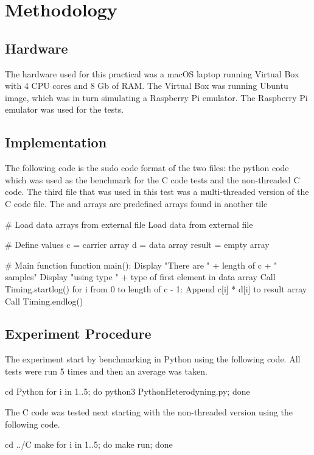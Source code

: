 \section{Methodology}

\subsection{Hardware}
The hardware used for this practical was a macOS laptop running Virtual Box with 4 CPU cores and 8 Gb of RAM. The Virtual Box was running Ubuntu image, which was in turn simulating a Raspberry Pi emulator. The Raspberry Pi emulator was used for the tests.

\subsection{Implementation}
The following code is the sudo code format of the two files: the python code which was used as the benchmark for the C code tests and the non-threaded C code.
The third file that was used in this test was a multi-threaded version of the C code file.
The  and  arrays are predefined arrays found in another tile

\begin{Cpp}
 # Load data arrays from external file
 Load data from external file

 # Define values
 c = carrier array
 d = data array
 result = empty array

 # Main function
 function main():
  Display "There are " + length of c + " samples"
  Display "using type " + type of first element in data array
  Call Timing.startlog()
  for i from 0 to length of c - 1:
  Append c[i] * d[i] to result array
  Call Timing.endlog()
\end{Cpp}

\subsection{Experiment Procedure}
The experiment start by benchmarking in Python using the following code. All tests were run 5 times and then an average was taken.

\begin{Cpp}
 cd Python
 for i in {1..5}; do python3 PythonHeterodyning.py; done
\end{Cpp}

The C code was tested next starting with the non-threaded version using the following code.
\begin{Cpp}
 cd ../C
 make
 for i in {1..5}; do make run; done
\end{Cpp}

